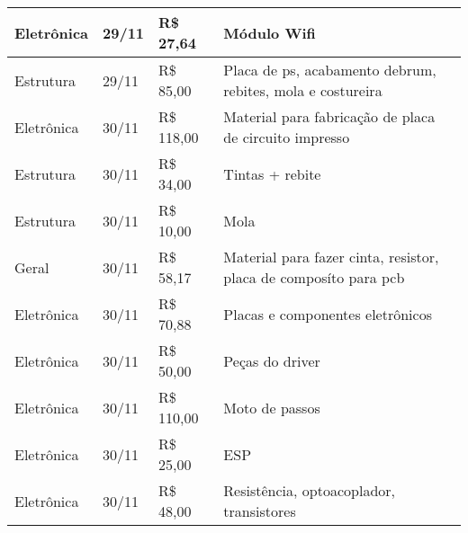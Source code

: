 \begin{table}[htp]
\begin{tabular}{|l|l|l|l|}
Eletrônica & 29/11 & R\$ 27,64 & Módulo Wifi \\ \hline
Estrutura & 29/11 & R\$ 85,00 & Placa de ps, acabamento debrum, rebites, mola e costureira \\ \hline
Eletrônica & 30/11 & R\$ 118,00 & Material para fabricação de placa de circuito impresso \\ \hline
Estrutura & 30/11 & R\$ 34,00 & Tintas + rebite \\ \hline
Estrutura & 30/11 & R\$ 10,00 & Mola \\ \hline
Geral & 30/11 & R\$ 58,17 & Material para fazer cinta, resistor, placa de composíto para pcb \\ \hline
Eletrônica & 30/11 & R\$ 70,88 & Placas e componentes eletrônicos \\ \hline
Eletrônica & 30/11 & R\$ 50,00 & Peças do driver \\ \hline
Eletrônica & 30/11 & R\$ 110,00 & Moto de passos \\ \hline
Eletrônica & 30/11 & R\$ 25,00 & ESP \\ \hline
Eletrônica & 30/11 & R\$ 48,00 & Resistência, optoacoplador, transistores \\ \hline
\end{tabular}
\end{table}